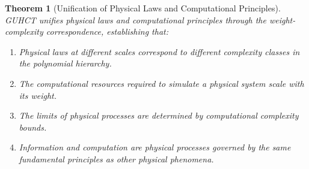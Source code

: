 \documentclass[11pt,a4paper]{article}
\newtheorem{theorem}{Theorem}[section]
\begin{document}
\begin{theorem}[Unification of Physical Laws and Computational Principles]
\label{thm:unification_axioms_thm} %
GUHCT unifies physical laws and computational principles through the weight-complexity correspondence, establishing that:
\begin{enumerate}
    \item Physical laws at different scales correspond to different complexity classes in the polynomial hierarchy.
    \item The computational resources required to simulate a physical system scale with its weight.
    \item The limits of physical processes are determined by computational complexity bounds.
    \item Information and computation are physical processes governed by the same fundamental principles as other physical phenomena.
\end{enumerate}
\end{theorem}
\end{document}
